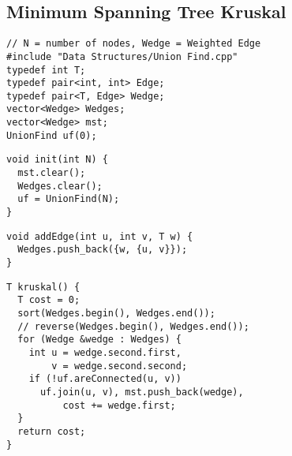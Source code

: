\documentclass[twoside]{article}
\begin{document}
\begin{multicols*}{2}
\subsection*{Minimum Spanning Tree Kruskal}
\begin{verbatim}
// N = number of nodes, Wedge = Weighted Edge
#include "Data Structures/Union Find.cpp"
typedef int T;
typedef pair<int, int> Edge;
typedef pair<T, Edge> Wedge;
vector<Wedge> Wedges;
vector<Wedge> mst;
UnionFind uf(0);
\end{verbatim}
\vspace{-12pt}
\begin{verbatim}
void init(int N) {
  mst.clear();
  Wedges.clear();
  uf = UnionFind(N);
}
\end{verbatim}
\vspace{-12pt}
\begin{verbatim}
void addEdge(int u, int v, T w) {
  Wedges.push_back({w, {u, v}});
}
\end{verbatim}
\vspace{-12pt}
\begin{verbatim}
T kruskal() {
  T cost = 0;
  sort(Wedges.begin(), Wedges.end());
  // reverse(Wedges.begin(), Wedges.end());
  for (Wedge &wedge : Wedges) {
    int u = wedge.second.first,
        v = wedge.second.second;
    if (!uf.areConnected(u, v))
      uf.join(u, v), mst.push_back(wedge),
          cost += wedge.first;
  }
  return cost;
}
\end{verbatim}

\subsectionfont{\large\bfseries\sffamily\underline}

\end{multicols*}
\end{document}
